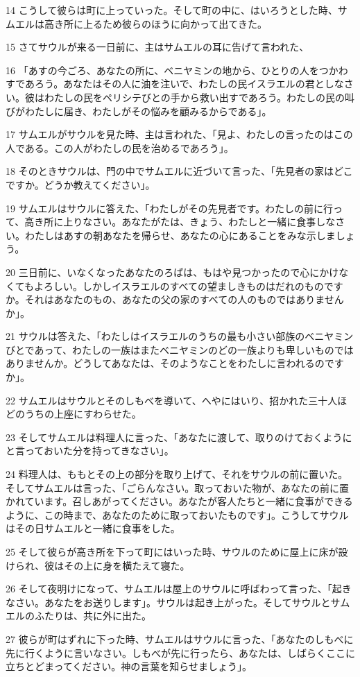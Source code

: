 \par 14 こうして彼らは町に上っていった。そして町の中に、はいろうとした時、サムエルは高き所に上るため彼らのほうに向かって出てきた。
\par 15 さてサウルが来る一日前に、主はサムエルの耳に告げて言われた、
\par 16 「あすの今ごろ、あなたの所に、ベニヤミンの地から、ひとりの人をつかわすであろう。あなたはその人に油を注いで、わたしの民イスラエルの君としなさい。彼はわたしの民をペリシテびとの手から救い出すであろう。わたしの民の叫びがわたしに届き、わたしがその悩みを顧みるからである」。
\par 17 サムエルがサウルを見た時、主は言われた、「見よ、わたしの言ったのはこの人である。この人がわたしの民を治めるであろう」。
\par 18 そのときサウルは、門の中でサムエルに近づいて言った、「先見者の家はどこですか。どうか教えてください」。
\par 19 サムエルはサウルに答えた、「わたしがその先見者です。わたしの前に行って、高き所に上りなさい。あなたがたは、きょう、わたしと一緒に食事しなさい。わたしはあすの朝あなたを帰らせ、あなたの心にあることをみな示しましょう。
\par 20 三日前に、いなくなったあなたのろばは、もはや見つかったので心にかけなくてもよろしい。しかしイスラエルのすべての望ましきものはだれのものですか。それはあなたのもの、あなたの父の家のすべての人のものではありませんか」。
\par 21 サウルは答えた、「わたしはイスラエルのうちの最も小さい部族のベニヤミンびとであって、わたしの一族はまたベニヤミンのどの一族よりも卑しいものではありませんか。どうしてあなたは、そのようなことをわたしに言われるのですか」。
\par 22 サムエルはサウルとそのしもべを導いて、へやにはいり、招かれた三十人ほどのうちの上座にすわらせた。
\par 23 そしてサムエルは料理人に言った、「あなたに渡して、取りのけておくようにと言っておいた分を持ってきなさい」。
\par 24 料理人は、ももとその上の部分を取り上げて、それをサウルの前に置いた。そしてサムエルは言った、「ごらんなさい。取っておいた物が、あなたの前に置かれています。召しあがってください。あなたが客人たちと一緒に食事ができるように、この時まで、あなたのために取っておいたものです」。こうしてサウルはその日サムエルと一緒に食事をした。
\par 25 そして彼らが高き所を下って町にはいった時、サウルのために屋上に床が設けられ、彼はその上に身を横たえて寝た。
\par 26 そして夜明けになって、サムエルは屋上のサウルに呼ばわって言った、「起きなさい。あなたをお送りします」。サウルは起き上がった。そしてサウルとサムエルのふたりは、共に外に出た。
\par 27 彼らが町はずれに下った時、サムエルはサウルに言った、「あなたのしもべに先に行くように言いなさい。しもべが先に行ったら、あなたは、しばらくここに立ちとどまってください。神の言葉を知らせましょう」。

